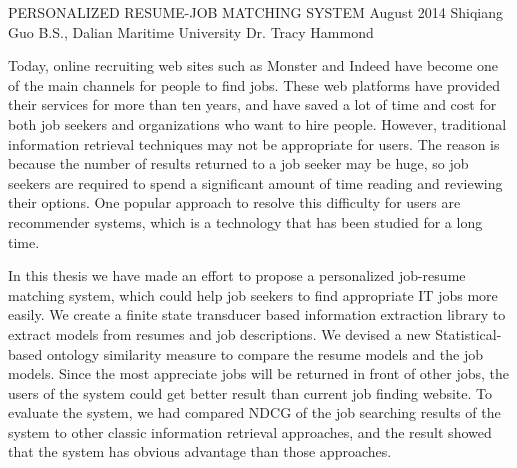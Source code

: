 \begingroup
\absone
{PERSONALIZED RESUME-JOB MATCHING SYSTEM}
{August 2014}
{Shiqiang Guo}
{B.S., Dalian Maritime University}  %
{Dr. Tracy Hammond}%
{
Today, online recruiting web sites such as Monster and Indeed have become one of the main channels for people to find jobs. These web platforms have provided their services for more than ten years, and have saved a lot of time and cost for both job seekers and organizations who want to hire people. However, traditional information retrieval techniques may not be appropriate for users. The reason is because the number of results returned to a job seeker may be huge, so job seekers are required to spend a significant amount of time reading and reviewing their options. One popular approach to resolve this difficulty for users are recommender systems, which is a technology that has been studied for a long time. 

In this thesis we have made an effort to propose a personalized job-resume matching system, which could help job seekers to find appropriate IT jobs more easily.  We create a finite state transducer based information extraction library to extract models from resumes and job descriptions. We devised a new Statistical-based ontology similarity measure to compare the resume models and the job models. Since the most appreciate jobs will be returned in front of other jobs, the users of the system could get better result than current job finding website. To evaluate the system, we had compared NDCG of the job searching results of the system to other classic information retrieval approaches, and the result showed that the system has obvious advantage than those approaches.

}
\endgroup



